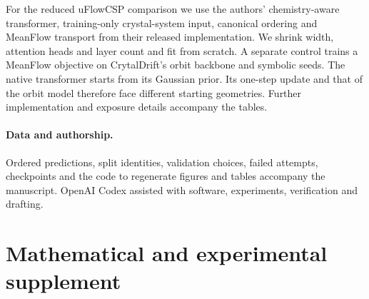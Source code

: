 \documentclass[10pt]{article}
\begin{document}
For the reduced uFlowCSP comparison we use the authors' chemistry-aware transformer, training-only crystal-system input, canonical ordering and MeanFlow transport from their released implementation. We shrink width, attention heads and layer count and fit from scratch. A separate control trains a MeanFlow objective on CrytalDrift's orbit backbone and symbolic seeds. The native transformer starts from its Gaussian prior. Its one-step update and that of the orbit model therefore face different starting geometries. Further implementation and exposure details accompany the tables.


\paragraph{Data and authorship.} Ordered predictions, split identities, validation choices, failed attempts, checkpoints and the code to regenerate figures and tables accompany the manuscript. OpenAI Codex assisted with software, experiments, verification and drafting.

\clearpage\appendix
\section*{Mathematical and experimental supplement}







\end{document}

